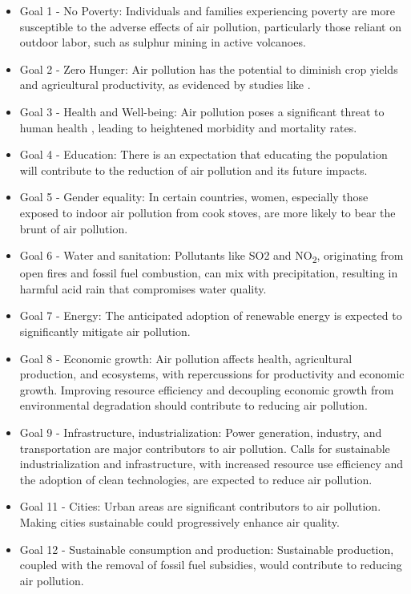 \begin{itemize}
    \item Goal 1 - No Poverty: Individuals and families experiencing poverty are more susceptible to the adverse effects of air pollution, particularly those reliant on outdoor labor, such as sulphur mining in active volcanoes.
    \item  Goal 2 - Zero Hunger: Air pollution has the potential to diminish crop yields and agricultural productivity, as evidenced by studies like \citep{avnery2011global}.
    \item Goal 3 - Health and Well-being: Air pollution poses a significant threat to human health \citep{who2020world}, leading to heightened morbidity and mortality rates.
    \item Goal 4 - Education: There is an expectation that educating the population will contribute to the reduction of air pollution and its future impacts.
    \item Goal 5 - Gender equality: In certain countries, women, especially those exposed to indoor air pollution from cook stoves, are more likely to bear the brunt of air pollution.
    \item Goal 6 - Water and sanitation: Pollutants like SO2 and NO\textsubscript{2}, originating from open fires and fossil fuel combustion, can mix with precipitation, resulting in harmful acid rain that compromises water quality.
    \item Goal 7 - Energy: The anticipated adoption of renewable energy is expected to significantly mitigate air pollution.
    \item Goal 8 - Economic growth: Air pollution affects health, agricultural production, and ecosystems, with repercussions for productivity and economic growth. Improving resource efficiency and decoupling economic growth from environmental degradation should contribute to reducing air pollution.
    \item Goal 9 - Infrastructure, industrialization: Power generation, industry, and transportation are major contributors to air pollution. Calls for sustainable industrialization and infrastructure, with increased resource use efficiency and the adoption of clean technologies, are expected to reduce air pollution.
    \item Goal 11 - Cities: Urban areas are significant contributors to air pollution. Making cities sustainable could progressively enhance air quality.
    \item Goal 12 - Sustainable consumption and production: Sustainable production, coupled with the removal of fossil fuel subsidies, would contribute to reducing air pollution.

\end{itemize}
